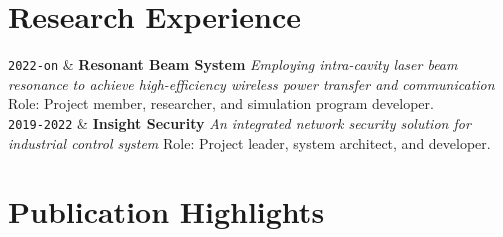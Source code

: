 \documentclass[9pt,a4paper]{article}
\newcommand{\Duration}[2]{\fontsize{10pt}{0}\selectfont \texttt{#1-#2}}
\newcommand{\Ongoing}{on}
\newcommand{\Website}[1]{\href{https://#1}{#1}}
\begin{document}
\section{Research Experience}

\begin{EntriesTableDuration}
  \Duration{2022}{\Ongoing} &
  \textbf{Resonant Beam System} %
  \newline
  \textit{Employing intra-cavity laser beam resonance to achieve high-efficiency wireless power transfer and communication}
  \newline
  Role: Project member, researcher, and simulation program developer.
  \\
  \Duration{2019}{2022} &
  \textbf{Insight Security}
  \newline
  \textit{An integrated network security solution for industrial control system}
  \newline
  Role: Project leader, system architect, and developer.
  \\

  
\end{EntriesTableDuration}


\section{Publication Highlights}
\end{document}
